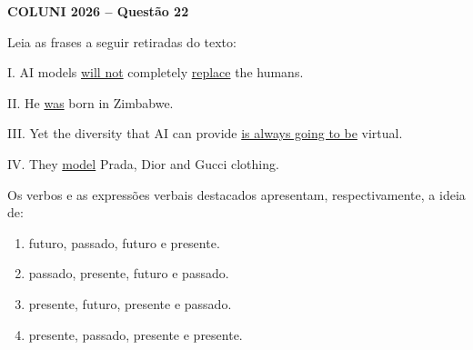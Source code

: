 \textbf{COLUNI 2026 -- Questão 22}\par\medskip Leia as frases a seguir retiradas do texto:\par\medskip
I. AI models \underline{will not} completely \underline{replace} the humans.\par
II. He \underline{was} born in Zimbabwe.\par
III. Yet the diversity that AI can provide \underline{is always going to be} virtual.\par
IV. They \underline{model} Prada, Dior and Gucci clothing.\par\medskip
Os verbos e as expressões verbais destacados apresentam, respectivamente, a ideia de:\begin{enumerate}
\item futuro, passado, futuro e presente.
\item passado, presente, futuro e passado.
\item presente, futuro, presente e passado.
\item presente, passado, presente e presente.\end{enumerate}
